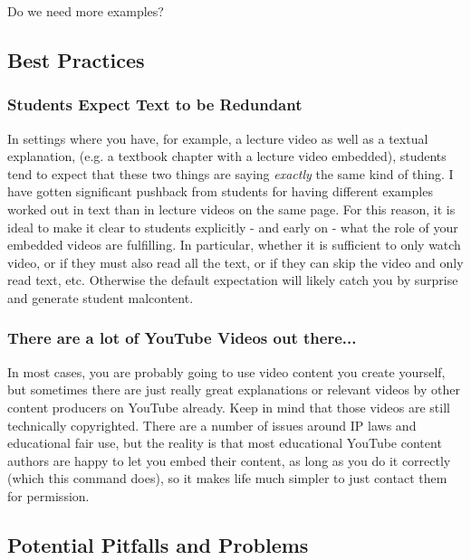 \documentclass{ximera}
\begin{document}
        Do we need more examples?
        
    \subsection*{Best Practices}
    
        \subsubsection*{Students Expect Text to be Redundant}
            In settings where you have, for example, a lecture video as well as a textual explanation, (e.g. a textbook chapter with a lecture video embedded), students tend to expect that these two things are saying \textit{exactly} the same kind of thing. I have gotten significant pushback from students for having different examples worked out in text than in lecture videos on the same page. For this reason, it is ideal to make it clear to students explicitly - and early on - what the role of your embedded videos are fulfilling. In particular, whether it is sufficient to only watch video, or if they must also read all the text, or if they can skip the video and only read text, etc. Otherwise the default expectation will likely catch you by surprise and generate student malcontent.
            
            
        \subsubsection*{There are a lot of YouTube Videos out there...}
            In most cases, you are probably going to use video content you create yourself, but sometimes there are just really great explanations or relevant videos by other content producers on YouTube already. Keep in mind that those videos are still technically copyrighted. There are a number of issues around IP laws and educational fair use, but the reality is that most educational YouTube content authors are happy to let you embed their content, as long as you do it correctly (which this command does), so it makes life much simpler to just contact them for permission.
        
    \subsection*{Potential Pitfalls and Problems}
\end{document}
